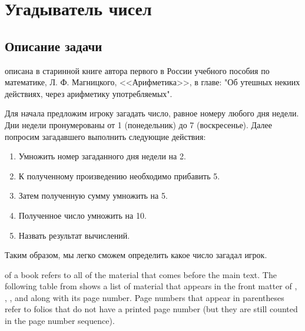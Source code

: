 \chapter{Угадыватель чисел}
\label{ch:guessnumbers}
\section{Описание задачи}
 описана в старинной книге автора первого в России учебного пособия по математике, Л. Ф. Магницкого, <<Арифметика>>, в главе: "Об утешных некиих действиях, через арифметику употребляемых".

Для начала предложим игроку загадать число, равное номеру любого дня недели. Дни недели пронумерованы от 1 (понедельник) до 7 (воскресенье). Далее попросим загадавшего выполнить следующие действия:

\begin{enumerate}
\item Умножить номер загаданного дня недели на 2.
\item К полученному произведению необходимо прибавить 5.
\item Затем полученную сумму умножить на 5.
\item Полученное число умножить на 10.
\item Назвать результат вычислений.
\end{enumerate}

Таким образом, мы легко сможем определить какое число загадал игрок.


 of a book refers to all of the material that
comes before the main text.  The following table from shows a list of
material that appears in the front matter of \VDQI, \EI, \VE, and \BE
along with its page number.  Page numbers that appear in parentheses refer
to folios that do not have a printed page number (but they are still
counted in the page number sequence).
